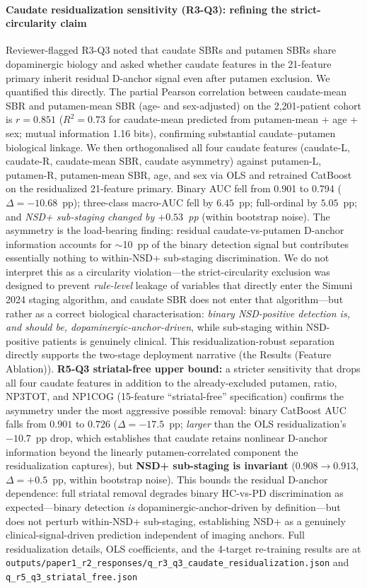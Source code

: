 \documentclass[10pt,letterpaper]{article}
\begin{document}
\paragraph*{Caudate residualization sensitivity (R3-Q3): refining the strict-circularity claim} Reviewer-flagged R3-Q3 noted that caudate SBRs and putamen SBRs share dopaminergic biology and asked whether caudate features in the 21-feature primary inherit residual D-anchor signal even after putamen exclusion. We quantified this directly. The partial Pearson correlation between caudate-mean SBR and putamen-mean SBR (age- and sex-adjusted) on the 2{,}201-patient cohort is $r{=}0.851$ ($R^2{=}0.73$ for caudate-mean predicted from putamen-mean + age + sex; mutual information 1.16 bits), confirming substantial caudate--putamen biological linkage. We then orthogonalised all four caudate features (caudate-L, caudate-R, caudate-mean SBR, caudate asymmetry) against putamen-L, putamen-R, putamen-mean SBR, age, and sex via OLS and retrained CatBoost on the residualized 21-feature primary. Binary AUC fell from 0.901 to 0.794 ($\Delta{=}{-}10.68$~pp); three-class macro-AUC fell by $6.45$~pp; full-ordinal by $5.05$~pp; and \emph{NSD+ sub-staging changed by ${+}0.53$~pp} (within bootstrap noise). The asymmetry is the load-bearing finding: residual caudate-vs-putamen D-anchor information accounts for $\sim$10~pp of the binary detection signal but contributes essentially nothing to within-NSD+ sub-staging discrimination. We do not interpret this as a circularity violation---the strict-circularity exclusion was designed to prevent \emph{rule-level} leakage of variables that directly enter the Simuni 2024 staging algorithm, and caudate SBR does not enter that algorithm---but rather as a correct biological characterisation: \emph{binary NSD-positive detection is, and should be, dopaminergic-anchor-driven}, while sub-staging within NSD-positive patients is genuinely clinical. This residualization-robust separation directly supports the two-stage deployment narrative (the Results (Feature Ablation)). \textbf{R5-Q3 striatal-free upper bound:} a stricter sensitivity that drops all four caudate features in addition to the already-excluded putamen, ratio, NP3TOT, and NP1COG (15-feature ``striatal-free'' specification) confirms the asymmetry under the most aggressive possible removal: binary CatBoost AUC falls from $0.901$ to $0.726$ ($\Delta{=}{-}17.5$~pp; \emph{larger} than the OLS residualization's $-10.7$~pp drop, which establishes that caudate retains nonlinear D-anchor information beyond the linearly putamen-correlated component the residualization captures), but \textbf{NSD+ sub-staging is invariant} ($0.908 \rightarrow 0.913$, $\Delta{=}{+}0.5$~pp, within bootstrap noise). This bounds the residual D-anchor dependence: full striatal removal degrades binary HC-vs-PD discrimination as expected---binary detection \emph{is} dopaminergic-anchor-driven by definition---but does not perturb within-NSD+ sub-staging, establishing NSD+ as a genuinely clinical-signal-driven prediction independent of imaging anchors. Full residualization details, OLS coefficients, and the 4-target re-training results are at \texttt{outputs/paper1\_r2\_responses/q\_r3\_q3\_caudate\_residualization.json} and \texttt{q\_r5\_q3\_striatal\_free.json} 
\end{document}
